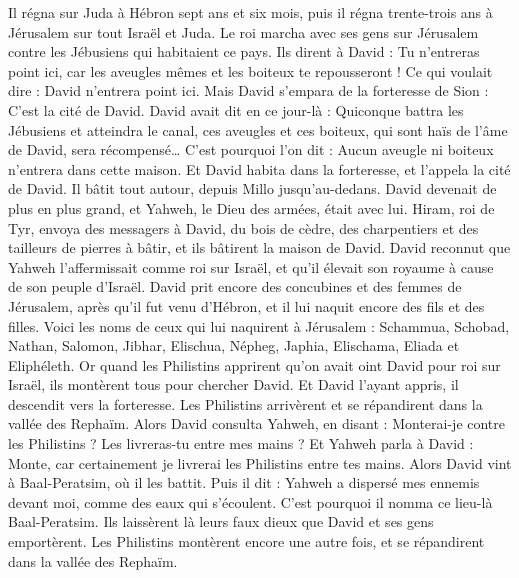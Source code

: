 \begin{multicols}{2}
Il régna sur Juda à Hébron sept ans et six mois, puis il régna trente-trois ans à Jérusalem sur tout Israël et Juda.
Le roi marcha avec ses gens sur Jérusalem contre les Jébusiens qui habitaient ce pays. Ils dirent à David : Tu n'entreras point ici, car les aveugles mêmes et les boiteux te repousseront ! Ce qui voulait dire : David n'entrera point ici.
Mais David s'empara de la forteresse de Sion : C'est la cité de David.
David avait dit en ce jour-là : Quiconque battra les Jébusiens et atteindra le canal, ces aveugles et ces boiteux, qui sont haïs de l'âme de David, sera récompensé… C'est pourquoi l'on dit : Aucun aveugle ni boiteux n'entrera dans cette maison.
Et David habita dans la forteresse, et l'appela la cité de David. Il bâtit tout autour, depuis Millo jusqu'au-dedans.
David devenait de plus en plus grand, et Yahweh, le Dieu des armées, était avec lui.
Hiram, roi de Tyr, envoya des messagers à David, du bois de cèdre, des charpentiers et des tailleurs de pierres à bâtir, et ils bâtirent la maison de David.
David reconnut que Yahweh l'affermissait comme roi sur Israël, et qu'il élevait son royaume à cause de son peuple d'Israël.
David prit encore des concubines et des femmes de Jérusalem, après qu'il fut venu d'Hébron, et il lui naquit encore des fils et des filles.
Voici les noms de ceux qui lui naquirent à Jérusalem : Schammua, Schobad, Nathan, Salomon,
Jibhar, Elischua, Népheg, Japhia,
Elischama, Eliada et Eliphéleth.
Or quand les Philistins apprirent qu'on avait oint David pour roi sur Israël, ils montèrent tous pour chercher David. Et David l'ayant appris, il descendit vers la forteresse.
Les Philistins arrivèrent et se répandirent dans la vallée des Rephaïm.
Alors David consulta Yahweh, en disant : Monterai-je contre les Philistins ? Les livreras-tu entre mes mains ? Et Yahweh parla à David : Monte, car certainement je livrerai les Philistins entre tes mains.
Alors David vint à Baal-Peratsim, où il les battit. Puis il dit : Yahweh a dispersé mes ennemis devant moi, comme des eaux qui s'écoulent. C'est pourquoi il nomma ce lieu-là Baal-Peratsim.
Ils laissèrent là leurs faux dieux que David et ses gens emportèrent.
Les Philistins montèrent encore une autre fois, et se répandirent dans la vallée des Rephaïm.

\end{multicols}
